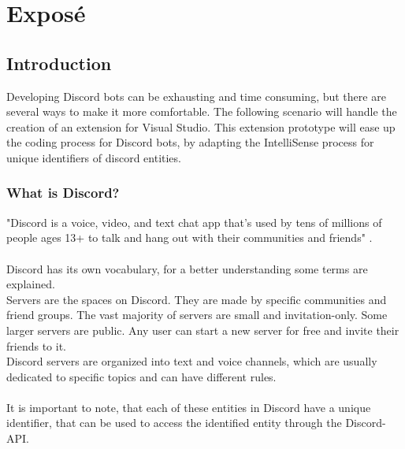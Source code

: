 \chapter{Exposé}

\section{Introduction}

Developing Discord bots can be exhausting and time consuming, but there are several ways to make it more comfortable.
The following scenario will handle the creation of an extension for Visual Studio. This extension prototype will ease up the coding process for Discord bots, by adapting the IntelliSense process for unique identifiers of discord entities.

\subsection{What is Discord?}

"Discord is a voice, video, and text chat app that's used by tens of millions of people ages 13+ to talk and hang out with their communities and friends" \cite{whatisdiscord}. \\\\
Discord has its own vocabulary, for a better understanding some terms are explained.\\
Servers are the spaces on Discord. They are made by specific communities and friend groups. The vast majority of servers are small and invitation-only. Some larger servers are public. Any user can start a new server for free and invite their friends to it.\\
Discord servers are organized into text and voice channels, which are usually dedicated to specific topics and can have different rules. \cite{whatisdiscord}\\\\
It is important to note, that each of these entities in Discord have a unique identifier, that can be used to access the identified entity through the Discord-API. 

